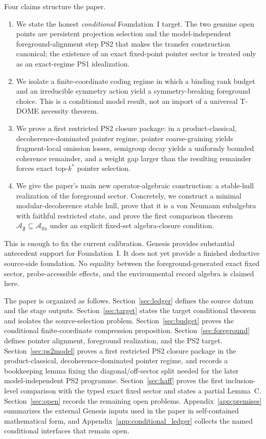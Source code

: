 \documentclass[12pt]{article}
\theoremstyle{definition}
\theoremstyle{remark}
\begin{document}
Four claims structure the paper.
\begin{enumerate}
\item We state the honest \emph{conditional} Foundation~I target. The
  two genuine open points are persistent projection selection and the
  model-independent foreground-alignment step PS2 that makes the
  transfer construction canonical; the existence of an exact fixed-point
  pointer sector is treated only as an exact-regime PS1 idealization.
\item We isolate a finite-coordinate coding regime in which a binding
  rank budget and an irreducible symmetry action yield a
  symmetry-breaking foreground choice. This is a conditional model
  result, not an import of a universal T-DOME necessity theorem.
\item We prove a first restricted PS2 closure package: in a
  product-classical, decoherence-dominated pointer regime, pointer
  coarse-graining yields fragment-local omission losses, semigroup decay
  yields a uniformly bounded coherence remainder, and a weight gap
  larger than the resulting remainder forces exact top-\(k^*\) pointer
  selection.
\item We give the paper's main new operator-algebraic construction: a
  stable-hull realization of the foreground sector. Concretely, we
  construct a minimal modular-decoherence stable hull, prove that it is
  a von Neumann subalgebra with faithful restricted state, and prove the
  first comparison theorem
  \(\mathcal A_{\mathfrak F}\subseteq
  \mathcal A_{\mathrm{fix}}\) under an explicit fixed-set algebra-closure
  condition.
\end{enumerate}

This is enough to fix the current calibration. Genesis provides
substantial antecedent support for Foundation~I. It does not yet
provide a finished deductive source-side foundation. No equality between
the foreground-generated exact fixed sector, probe-accessible effects,
and the environmental record algebra is claimed here.

The paper is organized as follows. Section~\ref{sec:ledger} defines the
source datum and the stage outputs. Section~\ref{sec:target} states the
target conditional theorem and isolates the source-selection problem.
Section~\ref{sec:budget} proves the conditional finite-coordinate
compression proposition. Section~\ref{sec:foreground} defines pointer alignment,
foreground realization, and the PS2 target. Section~\ref{sec:ps2model}
proves a first restricted PS2 closure package in the
product-classical, decoherence-dominated pointer regime, and records a
bookkeeping lemma fixing the diagonal/off-sector split needed for the
later model-independent PS2 programme.
Section~\ref{sec:haff} proves the first inclusion-level comparison with
the typed exact fixed sector and states a partial Lemma~C.
Section~\ref{sec:open} records the remaining open problems.
Appendix~\ref{app:premises} summarizes the external Genesis inputs used
in the paper in self-contained mathematical form, and
Appendix~\ref{app:conditional_ledger} collects the
named conditional interfaces that remain open.
\end{document}
